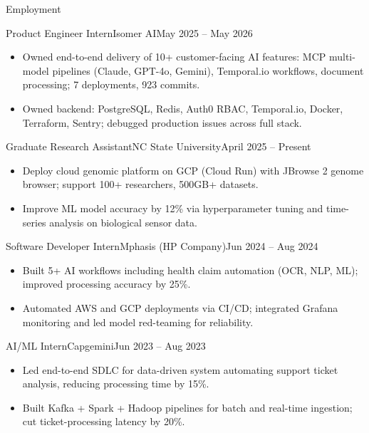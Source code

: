 \documentclass[]{mcdowellcv}
\begin{document}
\makeheader

\begin{cvsection}{Employment}
  \begin{cvsubsection}{Product Engineer Intern}{Isomer AI}{May 2025 -- May 2026}
    \begin{itemize}
      \item Owned end-to-end delivery of 10+ customer-facing AI features: MCP multi-model pipelines (Claude, GPT-4o, Gemini), Temporal.io workflows, document processing; 7 deployments, 923 commits.
      \item Owned backend: PostgreSQL, Redis, Auth0 RBAC, Temporal.io, Docker, Terraform, Sentry; debugged production issues across full stack.
    \end{itemize}
    \vspace{-1.5pt}
  \end{cvsubsection}

  \begin{cvsubsection}{Graduate Research Assistant}{NC State University}{April 2025 -- Present}
    \begin{itemize}
      \item Deploy cloud genomic platform on GCP (Cloud Run) with JBrowse 2 genome browser; support 100+ researchers, 500GB+ datasets.
      \item Improve ML model accuracy by 12\% via hyperparameter tuning and time-series analysis on biological sensor data.
    \end{itemize}
    \vspace{-1.5pt}
  \end{cvsubsection}

  \begin{cvsubsection}{Software Developer Intern}{Mphasis (HP Company)}{Jun 2024 -- Aug 2024}
    \begin{itemize}
      \item Built 5+ AI workflows including health claim automation (OCR, NLP, ML); improved processing accuracy by 25\%.
      \item Automated AWS and GCP deployments via CI/CD; integrated Grafana monitoring and led model red-teaming for reliability.
    \end{itemize}
    \vspace{-1.5pt}
  \end{cvsubsection}

  \begin{cvsubsection}{AI/ML Intern}{Capgemini}{Jun 2023 -- Aug 2023}
    \begin{itemize}
      \item Led end-to-end SDLC for data-driven system automating support ticket analysis, reducing processing time by 15\%.
      \item Built Kafka + Spark + Hadoop pipelines for batch and real-time ingestion; cut ticket-processing latency by 20\%.
    \end{itemize}
    \vspace{-1.5pt}
  \end{cvsubsection}
\end{cvsection}
\end{document}
